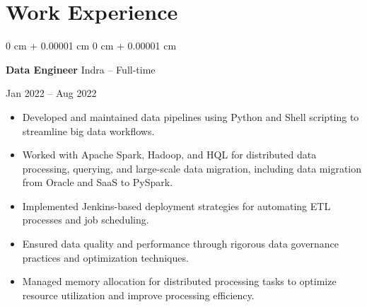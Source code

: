 \documentclass[10pt, letterpaper]{article}
\newenvironment{highlights}{
    \begin{itemize}[
        topsep=0.10 cm,
        parsep=0.10 cm,
        partopsep=0pt,
        itemsep=0pt,
        leftmargin=0 cm + 10pt
    ]
}{
    \end{itemize}
} %
\newenvironment{onecolentry}{
    \begin{adjustwidth}{
        0 cm + 0.00001 cm
    }{
        0 cm + 0.00001 cm
    }
}{
    \end{adjustwidth}
} %
\newenvironment{twocolentry}[2][]{
    \onecolentry
    \def\secondColumn{#2}
    \setcolumnwidth{\fill, 4.5 cm}
    \begin{paracol}{2}
}{
    \switchcolumn \raggedleft \secondColumn
    \end{paracol}
    \endonecolentry
} %
\begin{document}





\section*{Work Experience}
\small
\begin{twocolentry}{Jan 2022 – Aug 2022}
    \textbf{Data Engineer} \textbar Indra – Full-time
\end{twocolentry}
\begin{highlights}
    \item Developed and maintained data pipelines using Python and Shell scripting to streamline big data workflows.
    \item Worked with Apache Spark, Hadoop, and HQL for distributed data processing, querying, and large-scale data migration, including data migration from Oracle and SaaS to PySpark.
    \item Implemented Jenkins-based deployment strategies for automating ETL processes and job scheduling.
    \item Ensured data quality and performance through rigorous data governance practices and optimization techniques.
    \item Managed memory allocation for distributed processing tasks to optimize resource utilization and improve processing efficiency.
\end{highlights}
\end{document}
